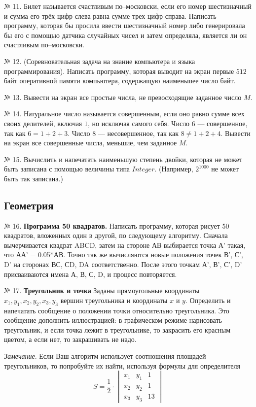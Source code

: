 № 11. Билет называется счастливым по--московски, если его номер шестизначный и сумма его трёх цифр слева равна сумме трех цифр справа. Написать программу, которая бы просила ввести шестизначный номер либо генерировала бы его с помощью датчика случайных чисел и затем определяла, является ли он счастливым по--московски.

№ 12. (Соревновательная задача на знание компьютера и языка программирования). Написать программу, которая выводит на экран первые $512$ байт оперативной памяти компьютера, содержащую наименьшее число байт.

№ 13. Вывести на экран все простые числа, не превосходящие заданное число $M$.

№ 14. Натуральное число называется совершенным, если оно равно сумме всех своих делителей, включая $1$, но исключая самого себя. Число $6$ --- совершенное, так как $6 = 1 + 2 + 3$. Число $8$ --- несовершенное, так как $8\neq 1 + 2 + 4$. Вывести на экран все совершенные числа, меньшие, чем заданное $M$.

№ 15. Вычислить и напечатать наименьшую степень двойки, которая не может быть записана с помощью величины типа $Integer$. (Например, $2^{1000}$ не может быть так записана.)

\subsection{Геометрия}

\hspace{7mm} № 16. {\bf Программа 50 квадратов.} Написать программу, которая рисует 50 квадратов, вложенных один в другой, по следующему алгоритму. Сначала вычерчивается квадрат ABCD, затем на стороне АВ выбирается точка А' такая, что АА' = 0.05*АВ. Точно так же вычисляются новые положения точек В', С', D' на сторонах ВС, СD, DA соответственно. После этого точкам А', В', С', D' присваиваются имена А, В, С, D, и процесс повторяется.

№ 17. {\bf Треугольник и точка} 
Заданы   прямоугольные координаты $x_1, y_1,x_2,y_2,x_3,y_3$ вершин треугольника и координаты $x$ и $y$. Определить и напечатать сообщение о положении точки относительно треугольника. Это сообщение дополнить иллюстрацией: в графическом режиме нарисовать треугольник, и если точка лежит в треугольнике, то закрасить его красным цветом, а если нет, то закрашивать не надо.

{\em Замечание}.   Если Ваш алгоритм использует соотношения площадей треугольников, то попробуйте их найти, используя формулы для определителя
$$S = \frac{1}{2} 
\cdot\begin{vmatrix} 
    x_1 & y_1 & 1\\
    x_2 & y_2 & 1\\
    x_3 & y_3 & 13
\end{vmatrix}
$$

